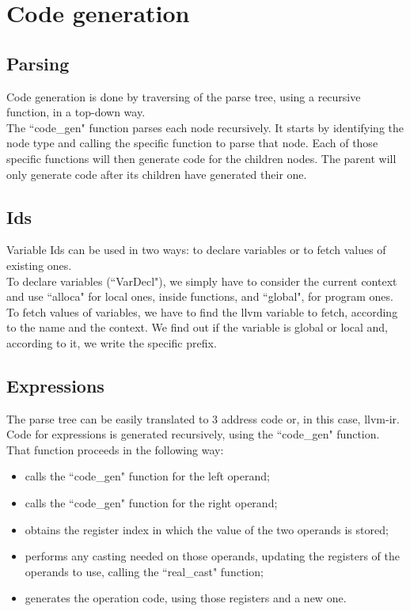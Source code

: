 \documentclass[12pt]{article}
\begin{document}
\newpage

\section{Code generation}

\subsection{Parsing}
Code generation is done by traversing of the parse tree, using a recursive function, in a top-down way. \\
The ``code\_gen" function parses each node recursively. It starts by identifying the node type and calling the specific function to parse that node. Each of those specific functions will then generate code for the children nodes. The parent will only generate code after its children have generated their one.

\subsection{Ids}
Variable Ids can be used in two ways: to declare variables or to fetch values of existing ones. \\
To declare variables (``VarDecl"), we simply have to consider the current context and use ``alloca" for local ones, inside functions, and ``global", for program ones. \\
To fetch values of variables, we have to find the llvm variable to fetch, according to the name and the context. We find out if the variable is global or local and, according to it, we write the specific prefix.

\subsection{Expressions}

The parse tree can be easily translated to 3 address code or, in this case, llvm-ir. \\
Code for expressions is generated recursively, using the ``code\_gen" function. That function proceeds in the following way:
\begin{itemize}
	\item calls the ``code\_gen" function for the left operand;
	\item calls the ``code\_gen" function for the right operand;
	\item obtains the register index in which the value of the two operands is stored;
	\item performs any casting needed on those operands, updating the registers of the operands to use, calling the ``real\_cast" function;
	\item generates the operation code, using those registers and a new one.
\end{itemize}
\end{document}
